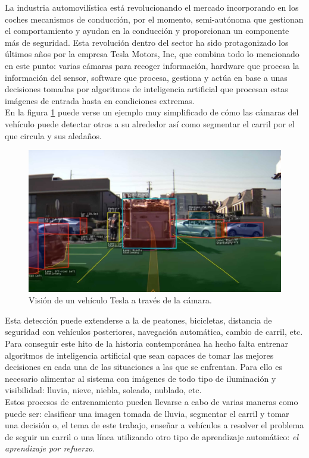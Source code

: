 La industria automovilística está revolucionando el mercado incorporando en los coches mecanismos de conducción, por el momento, semi-autónoma que gestionan el comportamiento y ayudan en la conducción y proporcionan un componente más de seguridad. Esta revolución dentro del sector ha sido protagonizado los últimos años por la empresa Tesla Motors, Inc, que combina todo lo mencionado en este punto: varias cámaras para recoger información, hardware que procesa la información del sensor, software que procesa, gestiona y actúa en base a unas decisiones tomadas por algoritmos de inteligencia artificial que procesan estas imágenes de entrada hasta en condiciones extremas.\\

En la figura \ref{fig:tesla-view} puede verse un ejemplo muy simplificado de cómo las cámaras del vehículo puede detectar otros a su alrededor así como segmentar el carril por el que circula y sus aledaños.

\begin{figure}[!ht]
    \centering \includegraphics[width=0.7\columnwidth]{./figures/chapter_1/tesla-view.jpg}
    \caption{Visión de un vehículo Tesla a través de la cámara.}\label{fig:tesla-view}
\end{figure}

Esta detección puede extenderse a la de peatones, bicicletas, distancia de seguridad con vehículos posteriores, navegación automática, cambio de carril, etc.\\

Para conseguir este hito de la historia contemporánea ha hecho falta entrenar algoritmos de inteligencia artificial que sean capaces de tomar las mejores decisiones en cada una de las situaciones a las que se enfrentan. Para ello es necesario alimentar al sistema con imágenes de todo tipo de iluminación y visibilidad: lluvia, nieve, niebla, soleado, nublado, etc.\\

Estos procesos de entrenamiento pueden llevarse a cabo de varias maneras como puede ser: clasificar una imagen tomada de lluvia, segmentar el carril y tomar una decisión o, el tema de este trabajo, enseñar a vehículos a resolver el problema de seguir un carril o una línea utilizando otro tipo de aprendizaje automático: \textit{el aprendizaje por refuerzo}.


